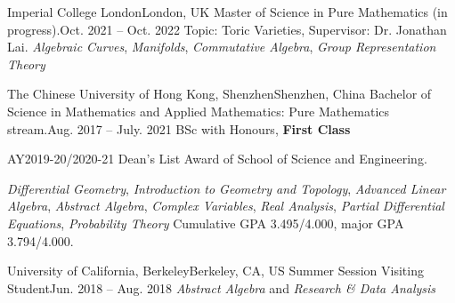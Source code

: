 \resumeSubHeadingListStart
	\resumeSubheading
		{Imperial College London}{London, UK}
		{Master of Science in Pure Mathematics (in progress).}{Oct. 2021 -- Oct. 2022}
		\resumeItemListStart
				{Topic: Toric Varieties, Supervisor: Dr. Jonathan Lai.}{}
				{\textit{Algebraic Curves}, \textit{Manifolds}, \textit{Commutative Algebra}, \textit{Group Representation Theory}}
		\resumeItemListEnd

	\resumeSubheading
		{The Chinese University of Hong Kong, Shenzhen}{Shenzhen, China}
		{Bachelor of Science in Mathematics and Applied Mathematics: Pure Mathematics stream.}{Aug. 2017 -- July. 2021}
		\resumeItemListStart
				{BSc with Honours, \textbf{First Class}}
				{AY2019-20/2020-21 Dean's List Award of School of Science and Engineering. \par}
				{\textit{Differential Geometry}, \textit{Introduction to Geometry and Topology}, \textit{Advanced Linear Algebra}, \textit{Abstract Algebra}, \textit{Complex Variables}, \textit{Real Analysis}, \textit{Partial Differential Equations}, \textit{Probability Theory}}
				{Cumulative GPA 3.495/4.000, major GPA 3.794/4.000.}
		\resumeItemListEnd
		

	\resumeSubheading
		{University of California, Berkeley}{Berkeley, CA, US}
		{Summer Session Visiting Student}{Jun. 2018 -- Aug. 2018}
		\resumeItemListStart
				{\textit{Abstract Algebra} and \textit{Research \& Data Analysis}}
		\resumeItemListEnd
		
\resumeSubHeadingListEnd